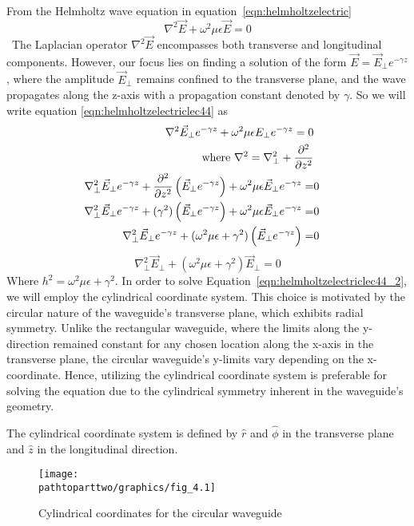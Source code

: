 From the Helmholtz wave equation in equation~\eqref{eqn:helmholtzelectric} 
\begin{equation}
\nabla^2\vec{E} + \omega^2\mu\epsilon\vec{E}=0
\label{eqn:helmholtzelectriclec44}
\end{equation}\
The Laplacian operator $\nabla^2\vec{E}$ encompasses both transverse and longitudinal components. However, our focus lies on finding a solution of the form $\vec{E}=\vec{E}_{\bot}e^{-\gamma z}$, where the amplitude $\vec{E}_\bot$ remains confined to the transverse plane, and the wave propagates along the z-axis with a propagation constant denoted by $\gamma$. So we will write equation \ref{eqn:helmholtzelectriclec44} as
\begin{align*}
\nabla^2\vec{E}_\perp e^{-\gamma z} + \omega^2 \mu\epsilon E_\perp e^{-\gamma z} = 0\\\text{where }\nabla^2 = \nabla^2_\perp + \partialderivative[2]{}{z}&\\
\nabla^2_\perp\vec{E}_\perp e^{-\gamma z} + \partialderivative[2]{}{z}\left(\vec{E}_\perp e^{-\gamma z}\right) + \omega^2\mu\epsilon\vec{E}_\perp e^{-\gamma z} =&  0\\
\nabla^2_\perp\vec{E}_\perp e^{-\gamma z} + (\gamma^2)\left(\vec{E}_\perp e^{-\gamma z}\right) + \omega^2\mu\epsilon\vec{E}_\perp e^{-\gamma z} =& 0\\
\nabla^2_\perp\vec{E}_\perp e^{-\gamma z} + (\omega^2\mu\epsilon + \gamma^2)\left(\vec{E}_\perp e^{-\gamma z}\right) =& 0
\end{align*}
\begin{equation}
\nabla^2_\perp\vec{E}_\perp + (\omega^2\mu\epsilon + \gamma^2)\vec{E}_\perp = 0
\label{eqn:helmholtzelectriclec44_2}
\end{equation}
Where $h^2 = \omega^2\mu\epsilon + \gamma^2$. In order to solve Equation~\ref{eqn:helmholtzelectriclec44_2}, we will employ the cylindrical coordinate system. This choice is motivated by the circular nature of the waveguide's transverse plane, which exhibits radial symmetry. Unlike the rectangular waveguide, where the limits along the y-direction remained constant for any chosen location along the x-axis in the transverse plane, the circular waveguide's y-limits vary depending on the x-coordinate. Hence, utilizing the cylindrical coordinate system is preferable for solving the equation due to the cylindrical symmetry inherent in the waveguide's geometry.
 
The cylindrical coordinate system is defined by $\hat{r}$ and $\hat{\phi}$ in the transverse plane and $\hat{z}$ in the longitudinal direction.
\begin{figure}[h]
\centering
\texttt{[image: \\pathtoparttwo/graphics/fig\_4.1]}
\caption{Cylindrical coordinates for the circular waveguide}
\label{fig:fig4}
\end{figure}

